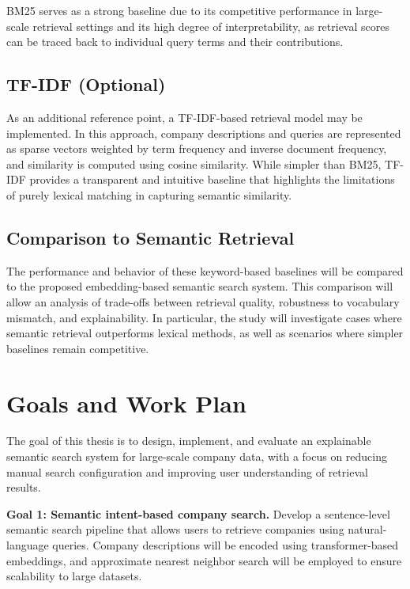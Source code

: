 \documentclass[a4paper]{scrartcl}
\begin{document}
BM25 serves as a strong baseline due to its competitive performance in large-scale retrieval settings and its high degree of interpretability, as retrieval scores can be traced back to individual query terms and their contributions.

\subsection{TF-IDF (Optional)}

As an additional reference point, a TF-IDF-based retrieval model may be implemented. In this approach, company descriptions and queries are represented as sparse vectors weighted by term frequency and inverse document frequency, and similarity is computed using cosine similarity. While simpler than BM25, TF-IDF provides a transparent and intuitive baseline that highlights the limitations of purely lexical matching in capturing semantic similarity.

\subsection{Comparison to Semantic Retrieval}

The performance and behavior of these keyword-based baselines will be compared to the proposed embedding-based semantic search system. This comparison will allow an analysis of trade-offs between retrieval quality, robustness to vocabulary mismatch, and explainability. In particular, the study will investigate cases where semantic retrieval outperforms lexical methods, as well as scenarios where simpler baselines remain competitive.

\section{Goals and Work Plan}

The goal of this thesis is to design, implement, and evaluate an explainable semantic search system for large-scale company data, with a focus on reducing manual search configuration and improving user understanding of retrieval results.

\noindent \textbf{Goal 1: Semantic intent-based company search.} Develop a sentence-level semantic search pipeline that allows users to retrieve companies using natural-language queries. Company descriptions will be encoded using transformer-based embeddings, and approximate nearest neighbor search will be employed to ensure scalability to large datasets.
\end{document}
